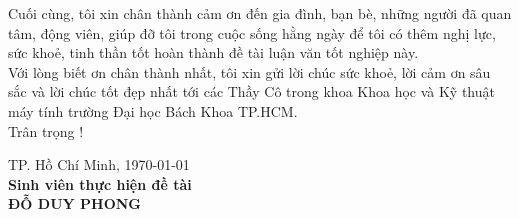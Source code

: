 \hspace{0.5cm}Cuối cùng, tôi xin chân thành cảm ơn đến gia đình, bạn bè, những người đã quan tâm, động viên, giúp đỡ tôi trong cuộc sống hằng ngày để tôi có thêm nghị lực, sức khoẻ, tinh thần tốt hoàn thành đề tài luận văn tốt nghiệp này.\\

\hspace{0.5cm}Với lòng biết ơn chân thành nhất, tôi xin gửi lời chúc sức khoẻ, lời cảm ơn sâu sắc và lời chúc tốt đẹp nhất tới các Thầy Cô trong khoa Khoa học và Kỹ thuật máy tính trường Đại học Bách Khoa TP.HCM.\\

\hspace{0.5cm}Trân trọng !\\

\hspace{5cm}
\begin{minipage}[t]{0.60\linewidth}
	\begin{center}
		TP. Hồ Chí Minh, \today\\
		\textbf{Sinh viên thực hiện đề tài}\\[3cm]
		\textbf{ĐỖ DUY PHONG}
	\end{center}
\end{minipage}

